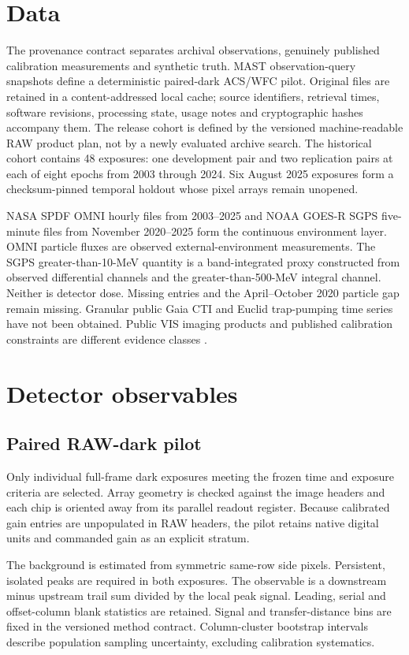 \documentclass[11pt]{article}
\begin{document}
\section{Data}
The provenance contract separates archival observations, genuinely published
calibration measurements and synthetic truth. MAST observation-query snapshots
define a deterministic paired-dark ACS/WFC pilot. Original files are retained in
a content-addressed local cache; source identifiers, retrieval times, software
revisions, processing state, usage notes and cryptographic hashes accompany them.
The release cohort is defined by the versioned machine-readable RAW product plan,
not by a newly evaluated archive search.
The historical cohort contains 48 exposures: one development pair and two
replication pairs at each of eight epochs from 2003 through 2024. Six August 2025
exposures form a checksum-pinned temporal holdout whose pixel arrays remain
unopened.

NASA SPDF OMNI hourly files from 2003--2025 and NOAA GOES-R SGPS five-minute files
from November 2020--2025 form the continuous environment layer. OMNI particle
fluxes are observed external-environment measurements. The SGPS greater-than-10-MeV
quantity is a band-integrated proxy constructed from observed differential channels
and the greater-than-500-MeV integral channel. Neither is detector dose. Missing
entries and the April--October 2020 particle gap remain missing. Granular public
Gaia CTI and Euclid trap-pumping time series
have not been obtained. Public VIS imaging products and published calibration
constraints are different evidence classes \citep{pagani2026,skottfelt2024,q1vis}.
\section{Detector observables}
\subsection{Paired RAW-dark pilot}
Only individual full-frame dark exposures meeting the frozen time and exposure
criteria are selected. Array geometry is checked against the image headers and
each chip is oriented away from its parallel readout register. Because calibrated
gain entries are unpopulated in RAW headers, the pilot retains native digital
units and commanded gain as an explicit stratum.

The background is estimated from symmetric same-row side pixels. Persistent,
isolated peaks are required in both exposures. The observable is a downstream
minus upstream trail sum divided by the local peak signal. Leading, serial and
offset-column blank statistics are retained. Signal and transfer-distance bins
are fixed in the versioned method contract. Column-cluster bootstrap intervals
describe population sampling uncertainty, excluding calibration systematics.
\end{document}
